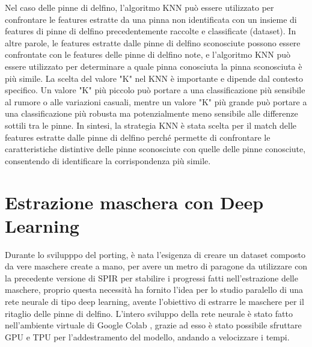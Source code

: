\documentclass[a4paper,12pt]{report}
\begin{document}
      Nel caso delle pinne di delfino, l'algoritmo KNN può essere utilizzato per confrontare le features estratte da una pinna non identificata con un insieme di features di pinne di delfino precedentemente raccolte e classificate (dataset). In altre parole, le features estratte dalle pinne di delfino sconosciute possono essere confrontate con le features delle pinne di delfino note, e l'algoritmo KNN può essere utilizzato per determinare a quale pinna conosciuta la pinna sconosciuta è più simile.
      La scelta del valore "K" nel KNN è importante e dipende dal contesto specifico. Un valore "K" più piccolo può portare a una classificazione più sensibile al rumore o alle variazioni casuali, mentre un valore "K" più grande può portare a una classificazione più robusta ma potenzialmente meno sensibile alle differenze sottili tra le pinne.
      In sintesi, la strategia KNN è stata scelta per il match delle features estratte dalle pinne di delfino perché permette di confrontare le caratteristiche distintive delle pinne sconosciute con quelle delle pinne conosciute, consentendo di identificare la corrispondenza più simile.





      \newpage
    \section{Estrazione maschera con Deep Learning}
      Durante lo svilupppo del porting, è nata l'esigenza di creare un dataset
      composto da vere maschere create a mano, per avere un metro di paragone da
      utilizzare con la precedente versione di SPIR per stabilire i progressi fatti nell'estrazione
      delle maschere, proprio questa necessità ha fornito l'idea per lo studio paralello di
      una rete neurale di tipo deep learning, avente l'obiettivo di estrarre le maschere per il 
      ritaglio delle pinne di delfino.
      L'intero sviluppo della rete neurale è stato fatto 
      nell'ambiente virtuale di Google Colab \cite{colab}, grazie ad esso è stato 
      possibile sfruttare GPU e TPU per l'addestramento del modello, andando a velocizzare i tempi.
\end{document}
